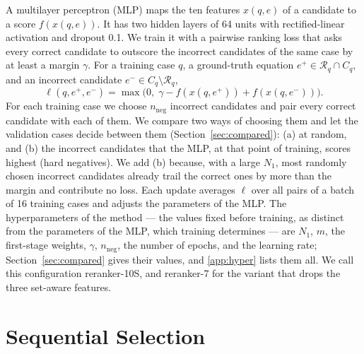 A multilayer perceptron (MLP) maps the ten features $x(q, e)$ of a candidate to a score
$f(x(q, e))$. It has two hidden layers of 64 units with rectified-linear activation and dropout
0.1.
We train it with a pairwise ranking loss\cite{LTR} that asks every correct candidate to outscore
the incorrect candidates of the same case by at least a margin $\gamma$. For a training case $q$,
a ground-truth equation $e^{+} \in \mathcal{R}_q \cap C_q$, and an incorrect candidate
$e^{-} \in C_q \setminus \mathcal{R}_q$,
\begin{equation}
  \ell(q, e^{+}, e^{-}) = \max\!\big(0,\; \gamma - f(x(q, e^{+})) + f(x(q, e^{-}))\big) .
  \label{eq:loss}
\end{equation}
For each training case we choose $n_{\mathrm{neg}}$ incorrect candidates and pair every correct
candidate with each of them. We compare two ways of choosing them and let the validation cases
decide between them (Section~\ref{sec:compared}): (a) at random, and (b) the incorrect candidates
that the MLP, at that point of training, scores highest (hard negatives). We add (b) because, with
a large $N_1$, most randomly chosen incorrect candidates already trail the correct ones by more
than the margin and contribute no loss. Each update averages $\ell$ over all pairs of a batch of 16
training cases and adjusts the parameters of the MLP. The hyperparameters of the method --- the
values fixed before training, as distinct from the parameters of the MLP, which training determines
--- are $N_1$, $m$, the first-stage weights, $\gamma$, $n_{\mathrm{neg}}$, the number of epochs,
and the learning rate; Section~\ref{sec:compared} gives their values, and \ref{app:hyper} lists them
all. We call this configuration reranker-10S, and reranker-7 for the variant that drops the three
set-aware features.

\section{Sequential Selection}
\label{sec:seq}

